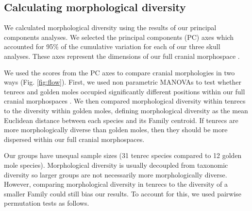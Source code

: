 \documentclass[12pt,a4paper]{article}
\begin{document}
	
\subsection{Calculating morphological diversity}


	We calculated morphological diversity using the results of our principal components analyses. We selected the principal components (PC) axes which accounted for 95\% of the cumulative variation for each of our three skull analyses. These axes represent the dimensions of our full cranial morphospace \citep{Polly2013}. 

	We used the scores from the PC axes to compare cranial morphologies in two ways (Fig. \ref{fig:flow}). First, we used non parametric MANOVAs %
	\citep{Anderson2001} to test whether tenrecs and golden moles occupied significantly different positions within our full cranial morphospaces \citep[e.g][]{Serb2011, Ruta2013}. We then compared morphological diversity within tenrecs to the diversity within golden moles, defining morphological diversity as the mean Euclidean distance between each species and its Family centroid. %
	 If tenrecs are more morphologically diverse than golden moles, then they should be more dispersed within our full cranial morphospaces. %
	
	Our groups have unequal sample sizes (31 tenrec species compared to 12 golden mole species). Morphological diversity is usually decoupled from taxonomic diversity \citep[e.g.][]{Ruta2013, Hopkins2013} so larger groups are not necessarily more morphologically diverse. However, comparing morphological diversity in tenrecs to the diversity of a smaller Family could still bias our results. To account for this, we used pairwise permutation tests as follows. 
	
\end{document}
